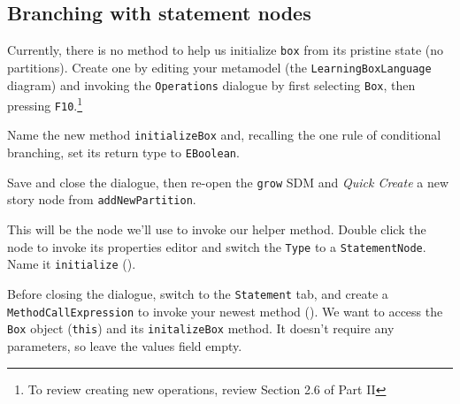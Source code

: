 \clearpage
\hypertarget{conBran vis}{}
\subsection{Branching with statement nodes}
\genHeader

\begin{stepbystep}

\item Currently, there is no method to help us initialize \texttt{box} from its pristine state (no partitions). Create one by editing
your metamodel (the \texttt{LearningBoxLanguage} diagram) and invoking the \texttt{Operations} dialogue by first selecting \texttt{Box}, then pressing
\texttt{F10}.\footnote{To review creating new operations, review Section 2.6 of Part II}

\item Name the new method \texttt{initializeBox} and, recalling the one rule of conditional branching, set its return type to
\texttt{EBoolean}.

\item Save and close the dialogue, then re-open the \texttt{grow} SDM and \emph{Quick Create} a new story node from
\texttt{addNewPartition}.

\item This will be the node we'll use to invoke our helper method. Double click the node to invoke its properties editor and switch the
\texttt{Type} to a \texttt{StatementNode}. Name it \texttt{initialize} ().

\item Before closing the dialogue, switch to the \texttt{Statement} tab, and create a \texttt{MethodCallExpression} to invoke your newest
method (). We want to access the \texttt{Box} object (\texttt{this}) and its \texttt{initalizeBox} method. It doesn't require any
parameters, so leave the values field empty. 


\end{stepbystep}
